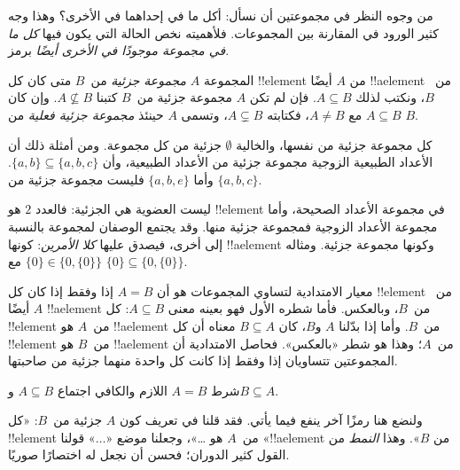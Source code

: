 \documentclass[../../../include/open-logic-section]{subfiles}
\begin{document}

\begin{explain}
من وجوه النظر في مجموعتين أن نسأل: أكل ما في إحداهما في الأخرى؟
وهذا وجه كثير الورود في المقارنة بين المجموعات. فلأهميته نخص الحالة
التي يكون فيها \emph{كل ما في مجموعة موجودًا في الأخرى أيضًا} برمز.
\end{explain}

\begin{defn}
المجموعة $A$ \emph{مجموعة جزئية} من~$B$ متى كان كل !!{element} من $A$
أيضًا !!a{element} من~$B$، ونكتب لذلك $A \subseteq B$.
فإن لم تكن $A$ مجموعة جزئية من~$B$ كتبنا $A \not\subseteq B$.
وإن كان $A \subseteq B$ مع $A \neq B$، فكتابته $A \subsetneq B$،
وتسمى $A$ حينئذ \emph{مجموعة جزئية فعلية} من $B$.
\end{defn}

\begin{ex}
كل مجموعة جزئية من نفسها، والخالية $\emptyset$ جزئية من كل مجموعة.
ومن أمثلة ذلك أن الأعداد الطبيعية الزوجية مجموعة جزئية من الأعداد
الطبيعية، وأن $\{ a, b \} \subseteq \{ a, b, c \}$.
وأما $\{ a, b, e
\}$ فليست مجموعة جزئية من $\{ a, b, c \}$.
\end{ex}

\begin{ex}
ليست العضوية هي الجزئية: فالعدد $2$ هو !!{element} في مجموعة الأعداد
الصحيحة، وأما مجموعة الأعداد الزوجية فمجموعة جزئية منها. وقد يجتمع
الوصفان لمجموعة بالنسبة إلى أخرى، فيصدق عليها \emph{كلا الأمرين}: كونها
!!a{element} وكونها مجموعة جزئية. ومثاله $\{0\} \in \{0, \{0\}\}$ مع $\{0\} \subseteq \{0,
\{0\}\}$.
\end{ex}

معيار الامتدادية لتساوي المجموعات هو أن $A = B$ إذا وفقط إذا كان
كل !!{element} من~$A$ أيضًا !!a{element} من~$B$، وبالعكس.
فأما شطره الأول فهو بعينه معنى $A \subseteq B$: كل !!{element}
من~$A$ هو !!a{element} من~$B$. وأما إذا بدّلنا $A$ و$B$، كان
$B \subseteq A$ معناه أن كل !!{element} من~$B$ هو !!a{element}
من~$A$؛ وهذا هو شطر «بالعكس». فحاصل الامتدادية أن المجموعتين تتساويان
إذا وفقط إذا كانت كل واحدة منهما جزئية من صاحبتها.

\begin{prop}
شرط $A = B$ اللازم والكافي اجتماع $A \subseteq B$ و$B \subseteq A$.
\end{prop}

ولنضع هنا رمزًا آخر ينفع فيما يأتي. فقد قلنا في تعريف كون $A$ جزئية
من~$B$: «كل !!{element} من~$A$ هو \dots»، وجعلنا موضع «$\dots$»
قولنا «!!a{element} من $B$». وهذا \emph{النمط} من القول كثير الدوران؛
فحسن أن نجعل له اختصارًا صوريًا.
\end{document}
